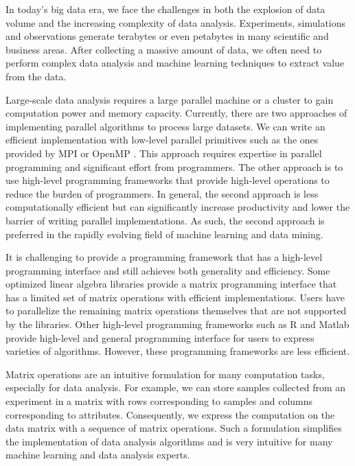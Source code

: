 
In today's big data era, we face the challenges in both the explosion of
data volume and the increasing complexity of data analysis. Experiments,
simulations and observations generate terabytes or
even petabytes in many scientific and business areas. After collecting
a massive amount of data, we often need to perform complex data analysis
and machine learning techniques to extract value from the data.


Large-scale data analysis requires a large parallel machine or a cluster to
gain computation power and memory capacity. Currently,
there are two approaches of implementing parallel algorithms to process large
datasets. We can write an efficient implementation with low-level parallel
primitives such as the ones provided by MPI \cite{mpi} or OpenMP \cite{openmp}.
This approach requires expertise in parallel programming and significant
effort from programmers. The other approach is to use high-level programming
frameworks that provide high-level operations to reduce the burden of
programmers. In general, the second approach is less computationally
efficient but can significantly increase productivity and lower the barrier
of writing parallel implementations. As such, the second approach is
preferred in the rapidly evolving field of machine learning and data mining.


It is challenging to provide a programming framework that has a high-level
programming interface and still achieves both generality and efficiency.
Some optimized linear algebra libraries \cite{mkl, openblas, elemental,
trilinos, petsc} provide a matrix programming interface that has a limited
set of matrix operations with efficient implementations. 
Users have to parallelize the remaining matrix
operations themselves that are not supported by the libraries. Other
high-level programming frameworks such as R and Matlab provide high-level and
general programming interface for users to express varieties of algorithms.
However, these programming frameworks are less efficient.


Matrix operations are an intuitive formulation for many computation tasks,
especially for data analysis. For example, we can store samples
collected from an experiment in a matrix with rows corresponding to samples
and columns corresponding to attributes.
Consequently, we express the computation on the data matrix with a sequence
of matrix operations. Such a formulation simplifies the implementation of
data analysis algorithms and is very intuitive for many machine learning
and data analysis experts.

